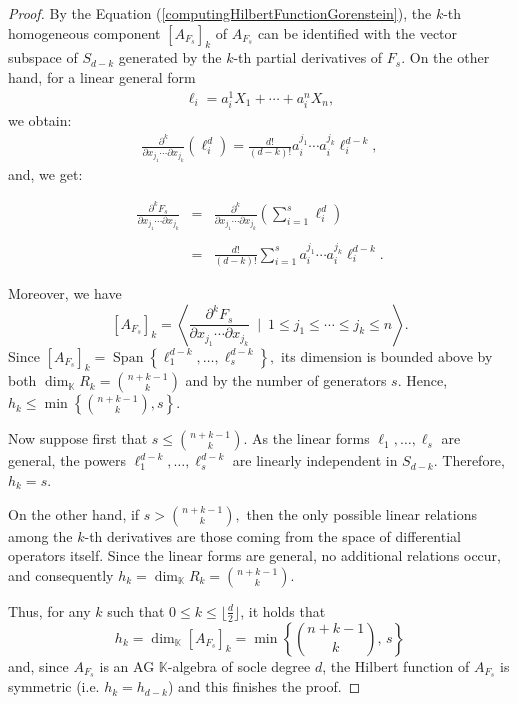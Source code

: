 \documentclass[10pt,a4paper]{amsart}
\newcommand{\K}{\mathbb{K}}
\begin{document}
\begin{proof}
  By the Equation (\ref{computingHilbertFunctionGorenstein}), the $k$-th homogeneous component $[A_{F_s}]_k$ of  $A_{F_s}$ can be  identified with the vector subspace of $S_{d-k}$
generated by the  $k$-th  partial derivatives of $F_s$. On the other hand, for a linear general form
\begin{eqnarray*}
\ell_i=a_{i}^1X_1+\cdots+a_{i}^nX_n,
\end{eqnarray*}
we obtain:
\begin{eqnarray*}
\frac{\partial^k}{\partial x_{j_1}\cdots\partial x_{j_k}}(\ell_i^d)
=
\frac{d!}{(d-k)!}
a_{i}^{j_1}\cdots a_{i}^{j_k}\ell_i^{d-k},
\end{eqnarray*}
and, we get:

$$
\begin{array}{rcl}
\frac{\partial^kF_s}{\partial x_{j_1}\cdots\partial x_{j_k}} &
= & 
\frac{\partial^k}{\partial x_{j_1}\cdots\partial x_{j_k}}(\sum _{i=1}^s\ell_i^d )\\  \\
& = &
\frac{d!}{(d-k)!}\sum _{i=1}^s
a_{i}^{j_1}\cdots a_{i}^{j_k}\ell_i^{d-k}.
\end{array}
$$

Moreover, we have
$$[A_{F_s}]_k=\left \langle  \frac{\partial^kF_s}{\partial x_{j_1}\cdots\partial x_{j_k}} \ \mid  \ 1\le j_1\le \cdots \le j_k\le n   \right\rangle .$$
Since $\left[A_{F_s}\right]_k=\operatorname{Span}\left\{\ell_1^{d-k}, \ldots, \ell_s^{d-k}\right\},$ its dimension is bounded above by both $\operatorname{dim}_{\mathbb{K}} R_k=\binom{n+k-1}{k}$ and by the number of generators $s$. Hence, $h_k \leq \min \left\{\binom{n+k-1}{k}, s\right\}.$

Now suppose first that
$s \leq\binom{ n+k-1}{k}$. As the linear forms $\ell_1, \ldots, \ell_s$ are general, the powers $\ell_1^{d-k}, \ldots, \ell_s^{d-k}$
are linearly independent in $S_{d-k}$. Therefore, $h_k=s.$

On the other hand, if $s > \binom{n+k-1}{k},$ then the only possible linear relations among the $k$-th derivatives are those coming from the space of differential operators itself. Since the linear forms are general, no additional relations occur, and consequently $h_k=\operatorname{dim}_{\mathbb{K}} R_k=\binom{n+k-1}{k}.$

Thus, for any $k$ such that $0\leq k\leq\lfloor\frac{d}{2}\rfloor$, it holds that
$$h_k=\dim_{\mathbb K}[A_{F_{s}}]_k
=\min\left\{\binom{n+k-1}{k},\, s\right\} $$
and, since $A_{F_s}$ is an AG $\K$-algebra  of socle degree $d$, the Hilbert function of $A_{F_s}$ is symmetric (i.e. $h_k = h_{d-k}$) and this finishes the proof. 
\end{proof}
\end{document}
